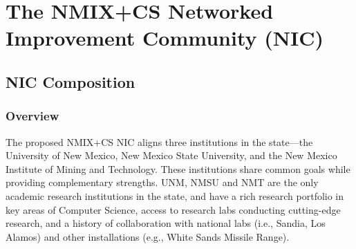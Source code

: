 \section{The NMIX+CS Networked Improvement Community (NIC)}
\label{sec:consortium}

\subsection{NIC Composition}

\subsubsection{Overview}
The proposed NMIX+CS NIC aligns three institutions in the state---the University of New Mexico, New Mexico State University, and the New Mexico Institute of Mining and Technology. These institutions share common goals while providing complementary strengths. UNM, NMSU and NMT are the only academic research institutions in the state, and have a rich research portfolio in key areas of Computer Science, access to research labs conducting cutting-edge research, and a history of collaboration with national labs (i.e., Sandia, Los Alamos) and other installations (e.g., White Sands Missile Range). %

